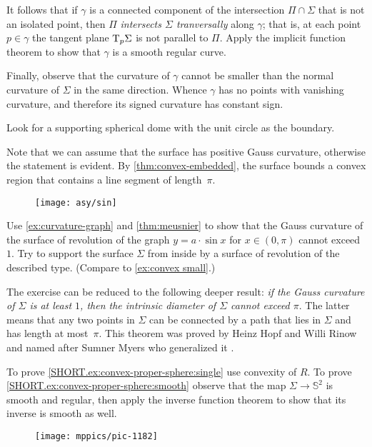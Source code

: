 It follows that if $\gamma$ is a connected component of the intersection $\Pi\cap\Sigma$ that is not an isolated point,
then $\Pi$ \emph{intersects $\Sigma$ tranversally} along $\gamma$;
that is, at each point $p \in \gamma$ the tangent plane $\mathrm{T}_p\Sigma$ is not parallel to $\Pi$.
Apply the implicit function theorem to show that $\gamma$ is a smooth regular curve.

Finally, observe that the curvature of $\gamma$ cannot be smaller than the normal curvature of $\Sigma$ in the same direction.
Whence $\gamma$ has no points with vanishing curvature, and therefore its signed curvature has constant sign.


Look for a supporting spherical dome with the unit circle as the boundary.

Note that we can assume that the surface has positive Gauss curvature, otherwise the statement is evident.
By \ref{thm:convex-embedded}, the surface bounds a convex region that contains a line segment of length~$\pi$.

\begin{figure}[h!]
\vskip-0mm
\centering
\texttt{[image: asy/sin]}
\vskip-0mm
\end{figure}

Use \ref{ex:curvature-graph} and \ref{thm:meusnier} to show that the Gauss curvature of the surface of revolution of the graph $y=a\cdot \sin x$ for $x\in(0,\pi)$ cannot exceed $1$.
Try to support the surface $\Sigma$ from inside by a surface of revolution of the described type.
(Compare to \ref{ex:convex small}.)

The exercise can be reduced to the following deeper result: \emph{if the Gauss curvature of $\Sigma$ is at least $1$,
then
the intrinsic diameter of $\Sigma$ cannot exceed $\pi$}.
The latter means that any two points in $\Sigma$ can be connected by a path that lies in $\Sigma$ and has length at most~$\pi$.
This theorem was proved by Heinz Hopf and Willi Rinow \cite{hopf-rinow} and 
named after Sumner Myers who generalized it \cite{myers}.

To prove \ref{SHORT.ex:convex-proper-sphere:single} use convexity of $R$.
To prove \ref{SHORT.ex:convex-proper-sphere:smooth} observe that the map $\Sigma\to\mathbb{S}^2$ is smooth and regular, then apply the inverse function theorem to show that its inverse is smooth as well.

\begin{wrapfigure}[16]{r}{29 mm}
\vskip-6mm
\centering
\texttt{[image: mppics/pic-1182]}
\vskip-0mm
\end{wrapfigure}

